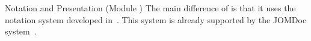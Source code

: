 
\begin{tchapter}[id=pres,short=Notation and Presentation]{Notation and Presentation (Module {})}
  The main difference of {} is that it uses the notation system developed
  in~\cite{cmueller:thesis:10,KMR:NoLMD08}. This system is already supported by the JOMDoc
  system~\cite{JOMDoc:on}.
\end{tchapter}

